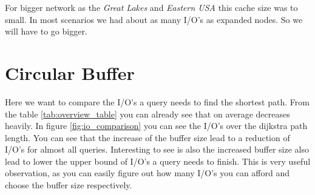 For bigger network as the \textit{Great Lakes} and \textit{Eastern USA} this cache size was to small. In most scenarios we had about as many I/O's as  expanded nodes. So we will have to go bigger.

\section{Circular Buffer}

Here we want to compare the I/O's a query needs to find the shortest path. From the table \ref{tab:overview_table} you can already see that on average decreases heavily. In figure \ref{fig:io_comparison} you can see the I/O's over the dijkstra path length.
You can see that the increase of the buffer size lead to a reduction of I/O's for almost all queries. Interesting to see is also the increased buffer size also lead to lower the upper bound of I/O's a query needs to finish. This is very useful observation,
as you can easily figure out how many I/O's you can afford and choose the buffer size respectively. 





